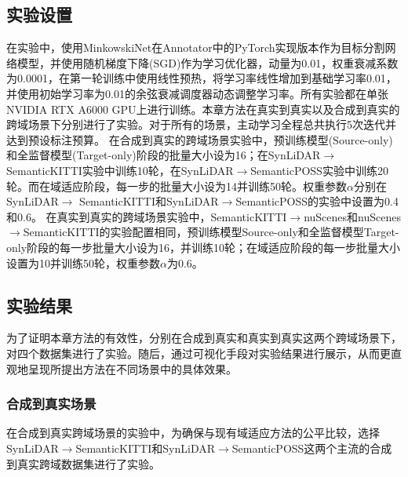 \subsection{实验设置}
在实验中，使用MinkowskiNet在Annotator中的PyTorch实现版本作为目标分割网络模型，并使用随机梯度下降(SGD)作为学习优化器，动量为0.01，权重衰减系数为0.0001，在第一轮训练中使用线性预热，将学习率线性增加到基础学习率0.01，并使用初始学习率为0.01的余弦衰减调度器动态调整学习率。所有实验都在单张NVIDIA RTX A6000 GPU上进行训练。本章方法在真实到真实以及合成到真实的跨域场景下分别进行了实验。对于所有的场景，主动学习全程总共执行5次迭代并达到预设标注预算。
在合成到真实的跨域场景实验中，预训练模型(Source-only)和全监督模型(Target-only)阶段的批量大小设为16；在SynLiDAR$\to$SemanticKITTI实验中训练10轮，在SynLiDAR$\to$SemanticPOSS实验中训练20轮。而在域适应阶段，每一步的批量大小设为14并训练50轮。权重参数$\alpha$分别在SynLiDAR$\to$ SemanticKITTI和SynLiDAR$\to$SemanticPOSS的实验中设置为0.4和0.6。
在真实到真实的跨域场景实验中，SemanticKITTI$\to$nuScenes和nuScenes$\to$SemanticKITTI的实验配置相同，预训练模型Source-only和全监督模型Target-only阶段的每一步批量大小设为16，并训练10轮；在域适应阶段的每一步批量大小设置为10并训练50轮，权重参数$\alpha$为0.6。
\subsection{实验结果}
为了证明本章方法的有效性，分别在合成到真实和真实到真实这两个跨域场景下，对四个数据集进行了实验。随后，通过可视化手段对实验结果进行展示，从而更直观地呈现所提出方法在不同场景中的具体效果。
\subsubsection{合成到真实场景}
在合成到真实跨域场景的实验中，为确保与现有域适应方法的公平比较，选择SynLiDAR\(\to\)SemanticKITTI和SynLiDAR\(\to\)SemanticPOSS这两个主流的合成到真实跨域数据集进行了实验。
\vspace{0.1cm}


